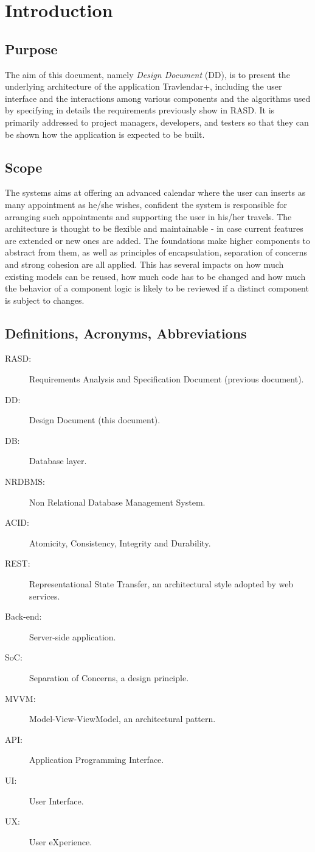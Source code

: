 \chapter{Introduction}
\label{cha:intro}

\section{Purpose}
\label{sec:purpose}
The aim of this document, namely \textit{Design Document} (DD), is to present the underlying architecture of the application Travlendar+, including the user interface and the interactions among various components and the algorithms used by specifying in details the requirements previously show in RASD. It is primarily addressed to project managers, developers, and testers so that they can be shown how the application is expected to be built.

\section{Scope}
\label{sec:scope}
The systems aims at offering an advanced calendar where the user can inserts as many appointment as he/she wishes, confident the system is responsible for arranging such appointments and supporting the user in his/her travels.  The architecture is thought to be flexible and maintainable - in case current features are extended or new ones are added. The  foundations make higher components to abstract from them, as well as principles of encapsulation, separation of concerns and strong cohesion are all applied. This has several impacts on how much existing models can be reused, how much code has to be changed and how much the behavior of a component logic is likely to be reviewed if a distinct component is subject to changes.

\section{Definitions, Acronyms, Abbreviations}
\label{sec:defs}
\begin{description}
\item[RASD:] Requirements Analysis and Specification Document (previous document).
\item[DD:] Design Document (this document).
\item[DB:] Database layer.
\item[NRDBMS:] Non Relational Database Management System.
\item[ACID:] Atomicity, Consistency, Integrity and Durability.
\item[REST:] Representational State Transfer, an architectural style adopted by web services.
\item[Back-end:] Server-side application.
\item[SoC:] Separation of Concerns, a design principle.
\item[MVVM:] Model-View-ViewModel, an architectural pattern.
\item[API:] Application Programming Interface.
\item[UI:] User Interface.
\item[UX:] User eXperience.
\end{description}

